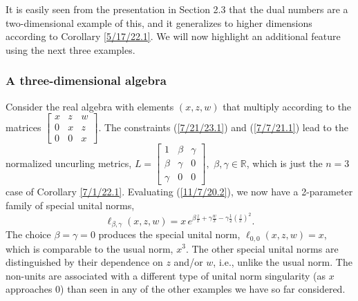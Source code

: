 \documentclass{amsart}
\numberwithin{equation}{section}
\theoremstyle{definition}
\numberwithin{theorem}{section}
\begin{document}
It is easily seen from the presentation in Section 2.3 that the dual numbers are a two-dimensional example of this, and it
generalizes to higher dimensions according to Corollary \ref{5/17/22.1}.  We will now highlight an additional feature using the next three examples.  

\subsubsection{A three-dimensional algebra}Consider the real algebra with elements  $(x,z,w)$ that multiply according to the matrices $ \left[
\begin{array}{ccc}
x & z & w   \\
0 & x & z \\
0 & 0 & x  
\end{array}
\right]$.    The constraints (\ref{7/21/23.1}) and (\ref{7/7/21.1}) lead to the normalized uncurling metrics, $ L = \left[
\begin{array}{ccc}
1 & \beta & \gamma   \\
\beta & \gamma & 0 \\
\gamma & 0 & 0  
\end{array}
\right], \,\,\beta,\gamma\in\mathbb{R}$, which is just the $n=3$ case of Corollary \ref{7/1/22.1}.    Evaluating (\ref{11/7/20.2}), we now have a 2-parameter family of special unital norms, \begin{equation}\label{3/31/21.3} \ell_{\beta,\gamma}(x,z,w) = x\, e^{ \beta\frac{z}{x}  +\gamma \frac{w}{x} -\gamma \frac{ 1}{2}\left(\frac{z}{x}\right)^2 }.\end{equation}    The choice $\beta = \gamma = 0$ produces the special unital norm, $\ell_{0,0}(x,z,w)= x$, which is comparable to the usual norm, $x^3$. 
 The other special unital norms are distinguished by their dependence on $z$ and/or $w$, i.e., unlike the usual norm.  The non-units are associated with a different type of unital norm singularity (as $x$ approaches 0) than seen in any of the other examples we have so far considered.
 
\end{document}

